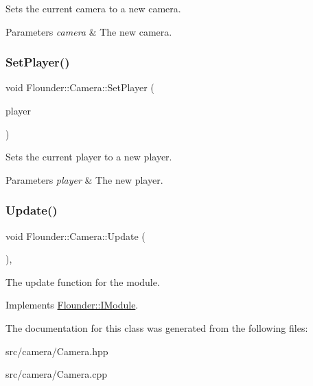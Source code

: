 Sets the current camera to a new camera. 


\begin{DoxyParams}{Parameters}
{\em camera} & The new camera. \\
\hline
\end{DoxyParams}
\mbox{\label{class_flounder_1_1_camera_a56d731269ad10b8c69f395f841b4e63f}} 
\subsubsection{\texorpdfstring{Set\+Player()}{SetPlayer()}}
{\footnotesize\ttfamily void Flounder\+::\+Camera\+::\+Set\+Player (\begin{DoxyParamCaption}\item[{\hyperlink{class_flounder_1_1_i_player}{I\+Player} $\ast$}]{player }\end{DoxyParamCaption})\hspace{0.3cm}{\ttfamily [inline]}}



Sets the current player to a new player. 


\begin{DoxyParams}{Parameters}
{\em player} & The new player. \\
\hline
\end{DoxyParams}
\mbox{\label{class_flounder_1_1_camera_a2469c44c33c89cb8f85be0e2441eccbf}} 
\subsubsection{\texorpdfstring{Update()}{Update()}}
{\footnotesize\ttfamily void Flounder\+::\+Camera\+::\+Update (\begin{DoxyParamCaption}{ }\end{DoxyParamCaption})\hspace{0.3cm}{\ttfamily [override]}, {\ttfamily [virtual]}}



The update function for the module. 



Implements \hyperlink{class_flounder_1_1_i_module_a1812bb03a6990e4698a10c043fa25fde}{Flounder\+::\+I\+Module}.



The documentation for this class was generated from the following files\+:\begin{DoxyCompactItemize}
\item 
src/camera/Camera.\+hpp\item 
src/camera/Camera.\+cpp\end{DoxyCompactItemize}
